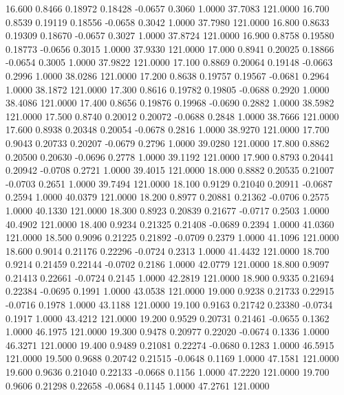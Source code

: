   16.600   0.8466   0.18972   0.18428  -0.0657   0.3060   1.0000  37.7083 121.0000
  16.700   0.8539   0.19119   0.18556  -0.0658   0.3042   1.0000  37.7980 121.0000
  16.800   0.8633   0.19309   0.18670  -0.0657   0.3027   1.0000  37.8724 121.0000
  16.900   0.8758   0.19580   0.18773  -0.0656   0.3015   1.0000  37.9330 121.0000
  17.000   0.8941   0.20025   0.18866  -0.0654   0.3005   1.0000  37.9822 121.0000
  17.100   0.8869   0.20064   0.19148  -0.0663   0.2996   1.0000  38.0286 121.0000
  17.200   0.8638   0.19757   0.19567  -0.0681   0.2964   1.0000  38.1872 121.0000
  17.300   0.8616   0.19782   0.19805  -0.0688   0.2920   1.0000  38.4086 121.0000
  17.400   0.8656   0.19876   0.19968  -0.0690   0.2882   1.0000  38.5982 121.0000
  17.500   0.8740   0.20012   0.20072  -0.0688   0.2848   1.0000  38.7666 121.0000
  17.600   0.8938   0.20348   0.20054  -0.0678   0.2816   1.0000  38.9270 121.0000
  17.700   0.9043   0.20733   0.20207  -0.0679   0.2796   1.0000  39.0280 121.0000
  17.800   0.8862   0.20500   0.20630  -0.0696   0.2778   1.0000  39.1192 121.0000
  17.900   0.8793   0.20441   0.20942  -0.0708   0.2721   1.0000  39.4015 121.0000
  18.000   0.8882   0.20535   0.21007  -0.0703   0.2651   1.0000  39.7494 121.0000
  18.100   0.9129   0.21040   0.20911  -0.0687   0.2594   1.0000  40.0379 121.0000
  18.200   0.8977   0.20881   0.21362  -0.0706   0.2575   1.0000  40.1330 121.0000
  18.300   0.8923   0.20839   0.21677  -0.0717   0.2503   1.0000  40.4902 121.0000
  18.400   0.9234   0.21325   0.21408  -0.0689   0.2394   1.0000  41.0360 121.0000
  18.500   0.9096   0.21225   0.21892  -0.0709   0.2379   1.0000  41.1096 121.0000
  18.600   0.9014   0.21176   0.22296  -0.0724   0.2313   1.0000  41.4432 121.0000
  18.700   0.9214   0.21459   0.22144  -0.0702   0.2186   1.0000  42.0779 121.0000
  18.800   0.9097   0.21413   0.22661  -0.0724   0.2145   1.0000  42.2819 121.0000
  18.900   0.9335   0.21694   0.22384  -0.0695   0.1991   1.0000  43.0538 121.0000
  19.000   0.9238   0.21733   0.22915  -0.0716   0.1978   1.0000  43.1188 121.0000
  19.100   0.9163   0.21742   0.23380  -0.0734   0.1917   1.0000  43.4212 121.0000
  19.200   0.9529   0.20731   0.21461  -0.0655   0.1362   1.0000  46.1975 121.0000
  19.300   0.9478   0.20977   0.22020  -0.0674   0.1336   1.0000  46.3271 121.0000
  19.400   0.9489   0.21081   0.22274  -0.0680   0.1283   1.0000  46.5915 121.0000
  19.500   0.9688   0.20742   0.21515  -0.0648   0.1169   1.0000  47.1581 121.0000
  19.600   0.9636   0.21040   0.22133  -0.0668   0.1156   1.0000  47.2220 121.0000
  19.700   0.9606   0.21298   0.22658  -0.0684   0.1145   1.0000  47.2761 121.0000
